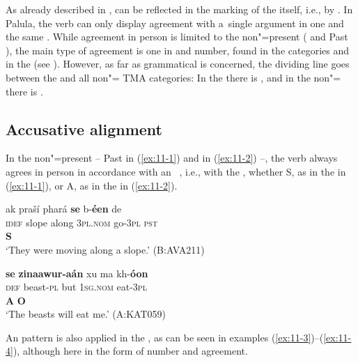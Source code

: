 As already described in ,  can be reflected in the marking of the  itself, i.e., by . In Palula, the verb can only display agreement with a~single argument in one and the same . While agreement in person is limited to the non"=present  ( and Past ), the main type of agreement is one in  and number, found in the  categories and in the  (see ). However, as far as grammatical  is concerned, the dividing line goes between the  and all non"= TMA categories: In the  there is  , and in the non"= there is  . 


\subsection{Accusative alignment}
\label{subsec:11-1-1}


In the non"=present  -- Past  in (\ref{ex:11-1}) and  in (\ref{ex:11-2}) --, the verb always agrees in person in accordance with an~ , i.e., with the , whether S, as in the   in (\ref{ex:11-1}), or A, as in the   in (\ref{ex:11-2}). 

\begin{exe}
\ex
\label{ex:11-1}
\glll ak praší phará \textbf{se} b-\textbf{éen} de \\
\textsc{idef} slope along \textsc{3pl.nom} go-\textsc{3pl} \textsc{pst} \\
{} {} {}  \textbf{S} \\
\glt `They were moving along a slope.' (B:AVA211)

\ex
\label{ex:11-2}
\glll \textbf{se} \textbf{zinaawur-aán} xu ma kh-\textbf{óon} \\
\textsc{def} beast-\textsc{pl} but \textsc{1sg.nom} eat-\textsc{3pl} \\
 \textbf{A} {} {}  \textbf{O} \\
\glt `The beasts will eat me.' (A:KAT059)
\end{exe}

An  pattern is also applied in the , as can be seen in examples (\ref{ex:11-3})--(\ref{ex:11-4}), although here in the form of number and  agreement.

